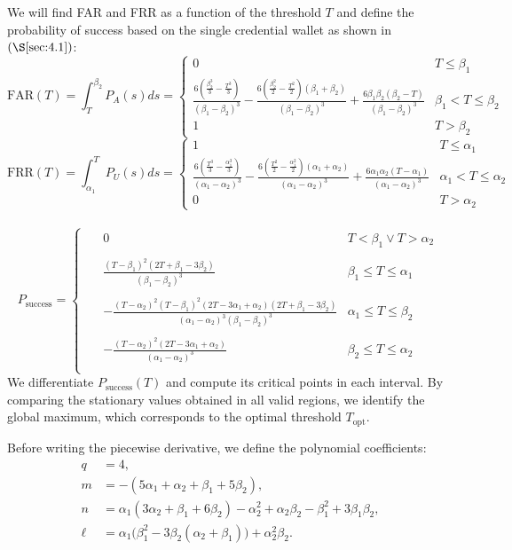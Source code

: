 \documentclass[sigconf]{acmart}
\theoremstyle{definition}
\begin{document}
We will find FAR and FRR as a function of the threshold $T$ and define the probability of success based on the single credential wallet as shown in $(\S\ref{sec:4.1})$:
\[\text{FAR}(T) = \int_{T}^{\beta_2} P_A(s) ds =
\left\{
\begin{array}{ll}
0 & T \le \beta_1 \\
\frac{6 \left(\frac{\beta_2^3}{3}-\frac{T^3}{3}\right)}{(\beta_1-\beta_2)^3}-\frac{6 \left(\frac{\beta_2^2}{2}-\frac{T^2}{2}\right) (\beta_1+\beta_2)}{(\beta_1-\beta_2)^3}+\frac{6 \beta_1 \beta_2 (\beta_2-T)}{(\beta_1-\beta_2)^3} & \beta_1 < T \le \beta_2 \\
1 & T > \beta_2
\end{array}
\right.
\]
\[\text{FRR}(T) = \int_{\alpha_1}^{T} P_U(s) ds =
\left\{
\begin{array}{ll}
1 & T \le \alpha_1 \\
\frac{6 \left(\frac{T^3}{3}-\frac{\alpha_1^3}{3}\right)}{(\alpha_1-\alpha_2)^3}-\frac{6 \left(\frac{T^2}{2}-\frac{\alpha_1^2}{2}\right) (\alpha_1+\alpha_2)}{(\alpha_1-\alpha_2)^3}+\frac{6 \alpha_1 \alpha_2 (T-\alpha_1)}{(\alpha_1-\alpha_2)^3} & \alpha_1 < T \le \alpha_2 \\
0 & T > \alpha_2
\end{array}
\right.
\]
\\
\[P_{{\text{success}}} =
\left\{
\begin{array}{cc}
\ &
\begin{array}{cc}
0 & T < \beta_1 \lor T > \alpha_2 \\
\\
\frac{(T-\beta_1)^2 (2 T+\beta_1-3 \beta_2)}{(\beta_1-\beta_2)^3} 
&  \beta_1 \le T \le \alpha_1 \\
\\
-\frac{(T-\alpha_2)^2 (T-\beta_1)^2 (2 T-3 \alpha_1+\alpha_2) (2 T+\beta_1-3 \beta_2)}{(\alpha_1-\alpha_2)^3 (\beta_1-\beta_2)^3}
& \alpha_1 \le T \le \beta_2 \\
\\
-\frac{(T-\alpha_2)^2 (2 T-3 \alpha_1+\alpha_2)}{(\alpha_1-\alpha_2)^3}
& \beta_2 \le T \le \alpha_2  \\
\end{array}
\end{array}
\right.
\]
We differentiate $P_{\text{success}}(T)$ and compute its critical points in each interval. By comparing the stationary values obtained in all valid regions, we identify the global maximum, which corresponds to the optimal threshold $T_{\text{opt}}$.

Before writing the piecewise derivative, we define the polynomial coefficients:
\[
\begin{aligned}
q &= 4, \\[6pt]
m &= -(5\alpha_1 + \alpha_2 + \beta_1 + 5\beta_2), \\[6pt]
n &= \alpha_1(3\alpha_2 + \beta_1 + 6\beta_2)
    - \alpha_2^2 + \alpha_2\beta_2 - \beta_1^2 + 3\beta_1\beta_2, \\[6pt]
\ell &= \alpha_1\bigl(\beta_1^2 - 3\beta_2(\alpha_2 + \beta_1)\bigr)
       + \alpha_2^2 \beta_2.
\end{aligned}
\]
\end{document}
